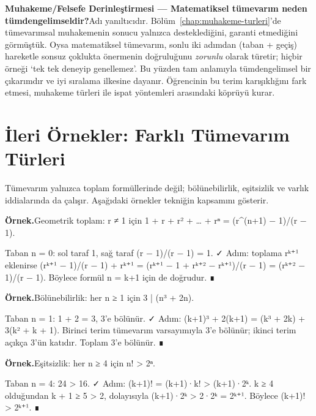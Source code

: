 \begin{tcolorbox}[bookbox,colback=cDep]\textbf{\textsf{\textcolor{cAcc}{Muhakeme/Felsefe Derinleştirmesi — Matematiksel tümevarım neden tümdengelimseldir?}}}\quad Adı yanıltıcıdır. Bölüm~\ref{chap:muhakeme-turleri}’de tümevarımsal muhakemenin sonucu yalnızca desteklediğini, garanti etmediğini görmüştük. Oysa matematiksel tümevarım, sonlu iki adımdan (taban + geçiş) hareketle sonsuz çoklukta önermenin doğruluğunu \emph{zorunlu} olarak türetir; hiçbir örneği ‘tek tek deneyip genellemez’. Bu yüzden tam anlamıyla tümdengelimsel bir çıkarımdır ve iyi sıralama ilkesine dayanır. Öğrencinin bu terim karışıklığını fark etmesi, muhakeme türleri ile ispat yöntemleri arasındaki köprüyü kurar.\end{tcolorbox}

\section{İleri Örnekler: Farklı Tümevarım Türleri}

Tümevarım yalnızca toplam formüllerinde değil; bölünebilirlik, eşitsizlik ve varlık iddialarında da çalışır. Aşağıdaki örnekler tekniğin kapsamını gösterir.

\begin{tcolorbox}[bookbox,colback=cEx]\textbf{\textsf{\textcolor{cAcc}{Örnek.}}}\quad Geometrik toplam: r ≠ 1 için 1 + r + r² + … + rⁿ = (r\textasciicircum{}(n+1) − 1)/(r − 1).\par\medskip{}Taban n = 0: sol taraf 1, sağ taraf (r − 1)/(r − 1) = 1. ✓  Adım: toplama rᵏ⁺¹ eklenirse (rᵏ⁺¹ − 1)/(r − 1) + rᵏ⁺¹ = (rᵏ⁺¹ − 1 + rᵏ⁺²  − rᵏ⁺¹)/(r − 1) = (rᵏ⁺² − 1)/(r − 1). Böylece formül n = k+1 için de doğrudur. ∎\end{tcolorbox}

\begin{tcolorbox}[bookbox,colback=cEx]\textbf{\textsf{\textcolor{cAcc}{Örnek.}}}\quad Bölünebilirlik: her n ≥ 1 için 3 | (n³ + 2n).\par\medskip{}Taban n = 1: 1 + 2 = 3, 3’e bölünür. ✓  Adım: (k+1)³ + 2(k+1) = (k³ + 2k) + 3(k² + k + 1). Birinci terim tümevarım varsayımıyla 3’e bölünür; ikinci terim açıkça 3’ün katıdır. Toplam 3’e bölünür. ∎\end{tcolorbox}

\begin{tcolorbox}[bookbox,colback=cEx]\textbf{\textsf{\textcolor{cAcc}{Örnek.}}}\quad Eşitsizlik: her n ≥ 4 için n! > 2ⁿ.\par\medskip{}Taban n = 4: 24 > 16. ✓  Adım: (k+1)! = (k+1)·k! > (k+1)·2ᵏ. k ≥ 4 olduğundan k + 1 ≥ 5 > 2, dolayısıyla (k+1)·2ᵏ > 2·2ᵏ = 2ᵏ⁺¹. Böylece (k+1)! > 2ᵏ⁺¹. ∎\end{tcolorbox}

